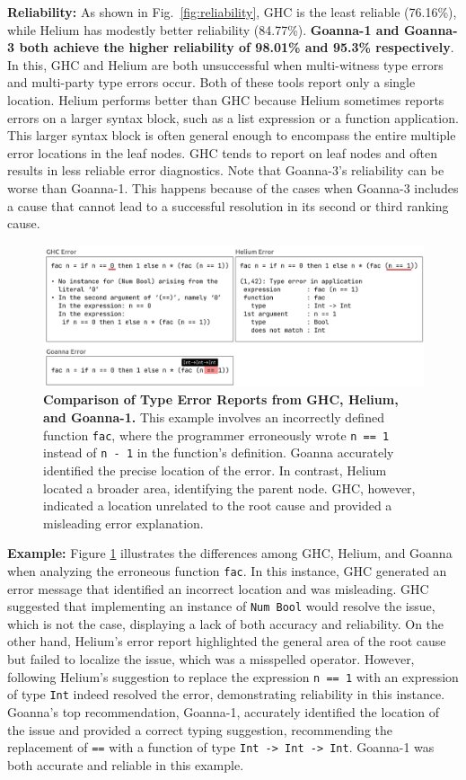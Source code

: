 \documentclass[pdflatex,lineno,sn-nature,Numbered]{sn-jnl}%
\begin{document}
\textbf{Reliability:} As shown in Fig.~\ref{fig:reliability}, GHC is the least reliable (76.16\%), while Helium has modestly better reliability (84.77\%). {\bf Goanna-1 and Goanna-3 both achieve the higher reliability of 98.01\% and 95.3\% respectively}. In this, GHC and Helium are both unsuccessful when multi-witness type errors and multi-party type errors occur. Both of these tools report only a single location. Helium performs better than GHC because Helium sometimes reports errors on a larger syntax block, such as a list expression or a function application. This larger syntax block is often general enough to encompass the entire multiple error locations in the leaf nodes. GHC tends to report on leaf nodes and often results in less reliable error diagnostics. Note that Goanna-3's reliability can be worse than Goanna-1. This happens because of the cases when Goanna-3 includes a cause that cannot lead to a successful resolution in its second or third ranking cause. 
    \begin{figure}
        \centering
        \includegraphics[width=\linewidth]{images/ErrorCompare}
\caption{{\bf Comparison of Type Error Reports from GHC, Helium, and Goanna-1.} This example involves an incorrectly defined function {\tt fac}, where the programmer erroneously wrote {\tt n == 1} instead of {\tt n - 1} in the function's definition. Goanna accurately identified the precise location of the error. In contrast, Helium located a broader area, identifying the parent node. GHC, however, indicated a location unrelated to the root cause and provided a misleading error explanation.}
        \label{fig:error-compare}
    \end{figure}


\textbf{Example:} Figure \ref{fig:error-compare} illustrates the differences among GHC, Helium, and Goanna when analyzing the erroneous function {\tt fac}. In this instance, GHC generated an error message that identified an incorrect location and was misleading. GHC suggested that implementing an instance of {\tt Num Bool} would resolve the issue, which is not the case, displaying a lack of both accuracy and reliability. On the other hand, Helium's error report highlighted the general area of the root cause but failed to localize the issue, which was a misspelled operator. However, following Helium's suggestion to replace the expression {\tt n == 1} with an expression of type {\tt Int} indeed resolved the error, demonstrating reliability in this instance. Goanna's top recommendation, Goanna-1, accurately identified the location of the issue and provided a correct typing suggestion, recommending the replacement of {\tt ==} with a function of type {\tt Int -> Int -> Int}. Goanna-1 was both accurate and reliable in this example.
    
\end{document}
